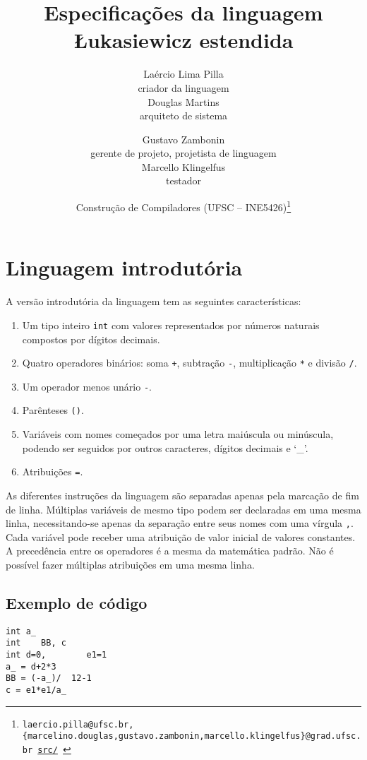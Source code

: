 \documentclass{article}
\title{\textbf{Especificações da linguagem Łukasiewicz estendida}}
\author{
    Laércio Lima Pilla \\
    {\small criador da linguagem} \vspace{3mm} \\
    Douglas Martins \\
    {\small arquiteto de sistema} \\
    \and Gustavo Zambonin \\
    {\small gerente de projeto, projetista de linguagem} \vspace{3mm} \\
    Marcello Klingelfus \\
    {\small testador} \\
    \and {\small Construção de Compiladores (UFSC -- INE5426)}\footnote{
        \texttt{laercio.pilla@ufsc.br,
        \{marcelino.douglas,gustavo.zambonin,marcello.klingelfus\}@grad.ufsc.br
        \hfill \href{https://github.com/zambonin/ufsc-ine5426}{src/}
    }}
}
\date{}
\newenvironment{smallenum}{
    \vspace{-1mm}
    \begin{enumerate}[label=\roman*.]
    \setlength{\parskip}{0pt}
    \setlength{\itemsep}{2pt}
}{
    \vspace{-2mm}
    \end{enumerate}
}
\begin{document}
\maketitle

\tableofcontents

\newpage

\section{Linguagem introdutória}

A versão introdutória da linguagem tem as seguintes características:

\begin{smallenum}

\item Um tipo inteiro \texttt{int} com valores representados por números
    naturais compostos por dígitos decimais.

\item Quatro operadores binários: soma \texttt{+}, subtração \texttt{-},
    multiplicação \texttt{*} e divisão \texttt{/}.

\item Um operador menos unário \texttt{-}.

\item Parênteses \texttt{()}.

\item Variáveis com nomes começados por uma letra maiúscula ou minúscula,
    podendo ser seguidos por outros caracteres, dígitos decimais e ‘\_’.

\item Atribuições \texttt{=}.

\end{smallenum}

As diferentes instruções da linguagem são separadas apenas pela marcação de
fim de linha. Múltiplas variáveis de mesmo tipo podem ser declaradas em uma
mesma linha, necessitando-se apenas da separação entre seus nomes com uma
vírgula \texttt{,}. Cada variável pode receber uma atribuição de valor inicial
de valores constantes. A precedência entre os operadores é a mesma da
matemática padrão. Não é possível fazer múltiplas atribuições em uma mesma
linha.

\subsection{Exemplo de código}

\begin{verbatim}
int a_
int    BB, c
int d=0,        e1=1
a_ = d+2*3
BB = (-a_)/  12-1
c = e1*e1/a_
\end{verbatim}
\end{document}
